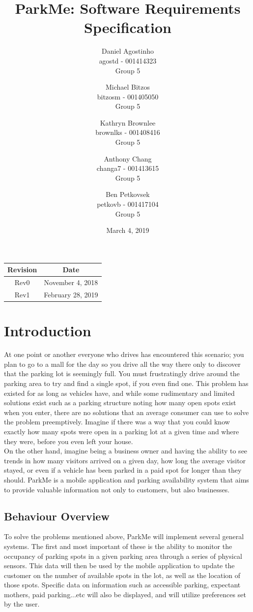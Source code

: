 \documentclass[]{article}
\title{ParkMe: Software Requirements Specification}
\author{Daniel Agostinho\\agostd - 001414323\\ Group 5 \and Michael Bitzos\\bitzosm - 001405050\\ Group 5 \and Kathryn Brownlee\\brownlks - 001408416\\ Group 5  \and Anthony Chang\\changa7 - 001413615\\ Group 5 \and Ben Petkovsek\\petkovb - 001417104\\ Group 5}
\begin{document}
\date{March 4, 2019}
\maketitle
\begin{center}
\begin{table}[b]
\centering
\begin{tabular}{|c|c|}
 \hline
 Revision & Date \\ 
 \hline
 Rev0 & November 4, 2018 \\ 
 Rev1 & February 28, 2019 \\ 
 \hline
\end{tabular}
\end{table}
\end{center}
\newpage
\tableofcontents
\newpage
\listoffigures
\listoftables
\newpage

\captionsetup{font=bf}

\section{Introduction}
At one point or another everyone who drives has encountered this scenario; you plan to go to a mall for the day so you drive all the way there only to discover that the parking lot is seemingly full. You must frustratingly drive around the parking area to try and find a single spot, if you even find one. This problem has existed for as long as vehicles have, and while some rudimentary and limited solutions exist such as a parking structure noting how many open spots exist when you enter, there are no solutions that an average consumer can use to solve the problem preemptively. Imagine if there was a way that you could know exactly how many spots were open in a parking lot at a given time and where they were, before you even left your house. \\

On the other hand, imagine being a business owner and having the ability to see trends in how many visitors arrived on a given day, how long the average visitor stayed, or even if a vehicle has been parked in a paid spot for longer than they should. ParkMe is a mobile application and parking availability system that aims to provide valuable information not only to customers, but also businesses.


\subsection{Behaviour Overview}
To solve the problems mentioned above, ParkMe will implement several general systems. The first and most important of these is the ability to monitor the occupancy of parking spots in a given parking area through a series of physical sensors. This data will then be used by the mobile application to update the customer on the number of available spots in the lot, as well as the location of those spots. Specific data on information such as accessible parking, expectant mothers, paid parking...etc will also be displayed, and will utilize preferences set by the user. \\
\end{document}
